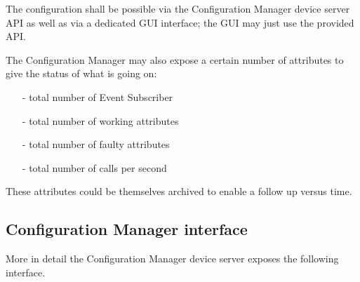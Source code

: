 \documentclass[11pt,a4paper]{article}
\def \es{Event Subscriber}
\def \cm{Configuration Manager}
\begin{document}
The configuration shall be possible via the \cm{} device
server API as well as via a dedicated GUI interface; the GUI may just
use the provided API.

The \cm{} may also expose a certain number of attributes to give the
status of what is going on:
\begin{itemize}
	\item[-] total number of \es
	\item[-] total number of working attributes
	\item[-] total number of faulty attributes
	\item[-] total number of calls per second
\end{itemize}
These attributes could be themselves archived to enable a follow
up versus time.

\subsection{\cm{} interface}
\label{cm:interface}
More in detail the \cm{} device server exposes the following interface.
\end{document}

